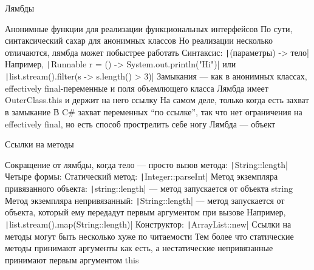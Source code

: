 \documentclass{../../slides-style}
\begin{document}
    \begin{frame}{Лямбды}
        \begin{outline}
            \1 Анонимные функции для реализации функциональных интерфейсов
                \2 По сути, синтаксический сахар для анонимных классов
                    \3 Но реализации несколько отличаются, лямбда может побыстрее работать
            \1 Синтаксис: \texttt|(параметры) -> тело|
                \2 Например, \texttt|Runnable r = () -> System.out.println("Hi")| или \texttt|list.stream().filter(s -> s.length() > 3)|
            \1 Замыкания --- как в анонимных классах, effectively final-переменные и поля объемлющего класса
                \2 Лямбда имеет OuterClass.this и держит на него ссылку
                    \3 На самом деле, только когда есть захват в замыкание
                \2 В C\# захват переменных \enquote{по ссылке}, так что нет ограничения на effectively final, но есть способ прострелить себе ногу
            \1 Лямбда --- объект
        \end{outline}
    \end{frame}

    \begin{frame}{Ссылки на методы}
        \begin{outline}
            \1 Сокращение от лямбды, когда тело --- просто вызов метода: \texttt|String::length|
            \1 Четыре формы:
                \2 Статический метод: \texttt|Integer::parseInt|
                \2 Метод экземпляра привязанного объекта: \texttt|string::length| --- метод запускается от объекта string
                \2 Метод экземпляра непривязанный: \texttt|String::length| --- метод запускается от объекта, который ему передадут первым аргументом при вызове
                    \3 Например, \texttt|list.stream().map(String::length)|
                \2 Конструктор: \texttt|ArrayList::new|
            \1 Ссылки на методы могут быть несколько хуже по читаемости
                \2 Тем более что статические методы принимают аргументы как есть, а нестатические непривязанные принимают первым аргументом this
        \end{outline}
    \end{frame}
\end{document}

